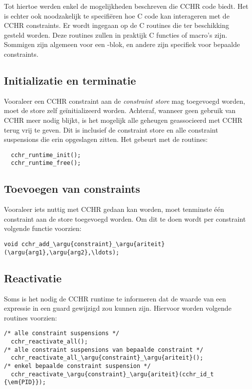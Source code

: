 Tot hiertoe werden enkel de mogelijkheden beschreven die CCHR code biedt. Het is echter ook noodzakelijk te specifi\"eren hoe C code kan interageren met de CCHR constraints. Er wordt ingegaan op de C routines die ter beschikking gesteld worden. Deze routines zullen in praktijk C functies of macro's zijn. Sommigen zijn algemeen voor een -blok, en andere zijn specifiek voor bepaalde constraints.

\subsection{Initializatie en terminatie}

Vooraleer een CCHR constraint aan de {\em constraint store} mag toegevoegd worden, moet de store zelf ge\"initializeerd worden. Achteraf, wanneer geen gebruik van CCHR meer nodig blijkt, is het mogelijk alle geheugen geassocieerd met CCHR terug vrij te geven. Dit is inclusief de constraint store en alle constraint suspensions die erin opgeslagen zitten. Het gebeurt met de routines:
\begin{Verbatim}
  cchr_runtime_init();
  cchr_runtime_free();
\end{Verbatim}

\subsection{Toevoegen van constraints}

Vooraleer iets nuttig met CCHR gedaan kan worden, moet tenminste \'e\'en constraint aan de store toegevoegd worden. Om dit te doen wordt per constraint volgende functie voorzien: \begin{Verbatim}[commandchars=\\\{\}]
  void cchr_add_\argu{constraint}_\argu{ariteit}(\argu{arg1},\argu{arg2},\ldots);
\end{Verbatim}

\subsection{Reactivatie} \label{sec:crout-reactiv}

Soms is het nodig de CCHR runtime te informeren dat de waarde van een expressie in een guard gewijzigd zou kunnen zijn. Hiervoor worden volgende routines voorzien: \begin{Verbatim}[commandchars=\\\{\}]
/* alle constraint suspensions */
  cchr_reactivate_all(); 
/* alle constraint suspensions van bepaalde constraint */
  cchr_reactivate_all_\argu{constraint}_\argu{ariteit}();
/* enkel bepaalde constraint suspension */
  cchr_reactivate_\argu{constraint}_\argu{ariteit}(cchr_id_t {\em{PID}});
\end{Verbatim}

